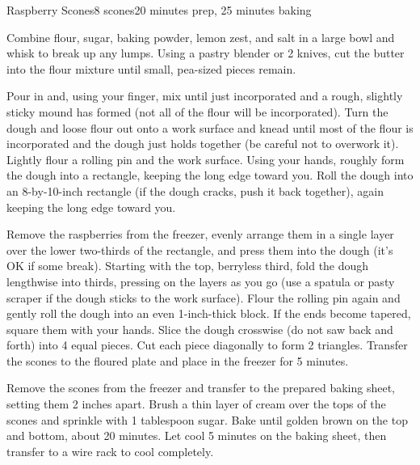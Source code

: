 \documentclass[../Cookbook.tex]{subfiles}
\begin{document}
\begin{recipe}{Raspberry Scones}{8 scones}{20 minutes prep, 25 minutes baking}



Combine flour, sugar, baking powder, lemon zest, and salt in a large bowl and whisk to break up any lumps. Using a pastry blender or 2 knives, cut the butter into the flour mixture until small, pea-sized pieces remain.

Pour in and, using your finger, mix until just incorporated and a rough, slightly sticky mound has formed (not all of the flour will be incorporated). Turn the dough and loose flour out onto a work surface and knead until most of the flour is incorporated and the dough just holds together (be careful not to overwork it). Lightly flour a rolling pin and the work surface. Using your hands, roughly form the dough into a rectangle, keeping the long edge toward you. Roll the dough into an 8-by-10-inch rectangle (if the dough cracks, push it back together), again keeping the long edge toward you.

Remove the raspberries from the freezer, evenly arrange them in a single layer over the lower two-thirds of the rectangle, and press them into the dough (it's OK if some break).
Starting with the top, berryless third, fold the dough lengthwise into thirds, pressing on the layers as you go (use a spatula or pasty scraper if the dough sticks to the work surface).
Flour the rolling pin again and gently roll the dough into an even 1-inch-thick block. If the ends become tapered, square them with your hands. Slice the dough crosswise (do not saw back and forth) into 4 equal pieces. Cut each piece diagonally to form 2 triangles.
Transfer the scones to the floured plate and place in the freezer for 5 minutes.

\newstep
Remove the scones from the freezer and transfer to the prepared baking sheet, setting them 2 inches apart. Brush a thin layer of cream over the tops of the scones and sprinkle with 1 tablespoon sugar. Bake until golden brown on the top and bottom, about 20 minutes. Let cool 5 minutes on the baking sheet, then transfer to a wire rack to cool completely.

\end{recipe}
\end{document}
